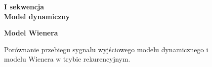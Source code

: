 \documentclass[a4paper,titlepage,11pt,floatssmall]{mwrep}
\begin{document}
\begin{figure}[h!]

\begin{center}
\Large \textbf{I sekwencja} \\
\vspace{0.5cm}
\Large \textbf{Model dynamiczny}
\end{center}

\centering
{}
\hfill
{}

\begin{center}
\Large \textbf{Model Wienera}
\end{center}

\hfill
{}
\caption{Porównanie przebiegu sygnału wyjściowego modelu dynamicznego i modelu Wienera w trybie rekurencyjnym.}
\end{figure}
\end{document}
